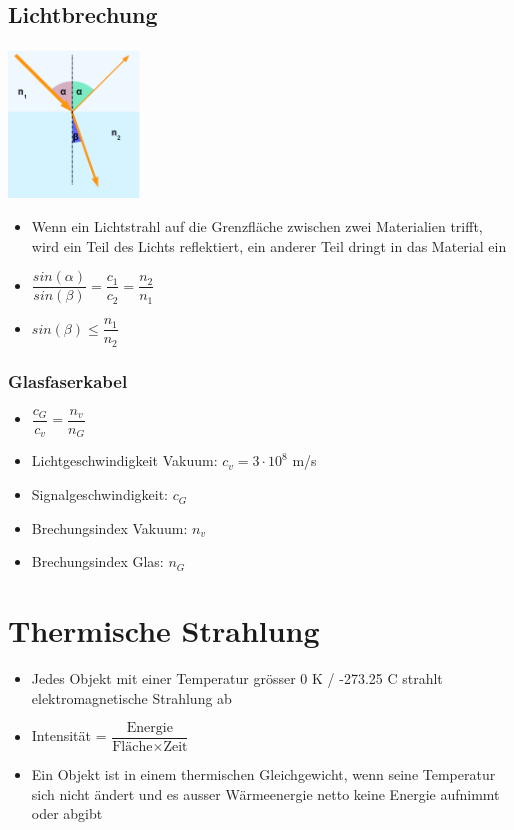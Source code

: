 \documentclass[8pt,a4paper]{scrartcl}
\begin{document}
\begin{multicols*}{3}
				\subsection{Lichtbrechung}
					\includegraphics[height=4cm]{img/brechung.png} 
					\begin{itemize}\itemsep0pt
						\item Wenn ein Lichtstrahl auf die Grenzfläche zwischen zwei Materialien trifft, wird ein Teil des Lichts reflektiert, ein anderer Teil dringt in das Material ein
						
						\item $\dfrac{sin(\alpha)}{sin(\beta)}=\dfrac{c_{1}}{c_{2}}=\dfrac{n_{2}}{n_{1}}$
						\item $sin(\beta)\leq \dfrac{n_{1}}{n_{2}}$
					\end{itemize}	
					
					
					\subsubsection{Glasfaserkabel}
						\begin{itemize}\itemsep0pt
							\item $\dfrac{c_{G}}{c_{v}}=\dfrac{n_{v}}{n_{G}}$
							\item Lichtgeschwindigkeit Vakuum: $c_{v} = 3\cdot 10^{8}$ m/s 
							\item Signalgeschwindigkeit: $c_{G}$
							\item Brechungsindex Vakuum: $n_{v}$ 
							\item Brechungsindex Glas: $n_{G}$ 
						\end{itemize}	
						
				\section{Thermische Strahlung}
					\begin{itemize}\itemsep0pt
						\item Jedes Objekt mit einer Temperatur grösser 0 K / -273.25 C strahlt elektromagnetische Strahlung ab
						\item Intensität = $\dfrac{\text{Energie}}{\text{Fläche} \times \text{Zeit}}$
						\item Ein Objekt ist in einem thermischen Gleichgewicht, wenn seine Temperatur sich nicht ändert und es ausser Wärmeenergie netto keine Energie aufnimmt oder abgibt
					\end{itemize}
					

\end{multicols*}
\end{document}
